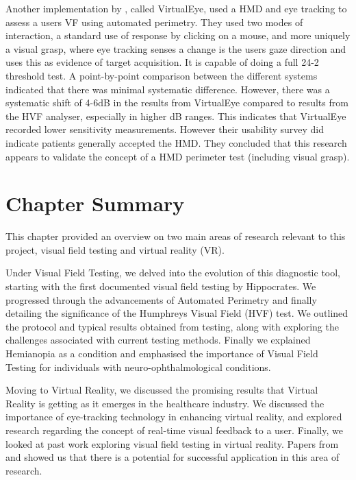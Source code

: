 \documentclass{l4proj}
\begin{document}
Another implementation by \citet{Wroblewski2014TestingVisualField}, called VirtualEye, used a HMD and eye tracking to assess a users VF using automated perimetry. They used two modes of interaction, a standard use of response by clicking on a mouse, and more uniquely a visual grasp, where eye tracking senses a change is the users gaze direction and uses this as evidence of target acquisition. It is capable of doing a full 24-2 threshold test. A point-by-point comparison between the different systems indicated that there was minimal systematic difference. However, there was a systematic shift of 4-6dB in the results from VirtualEye compared to results from the HVF analyser, especially in higher dB ranges. This indicates that VirtualEye recorded lower sensitivity measurements. However their usability survey did indicate patients generally accepted the HMD. They concluded that this research appears to validate the concept of a HMD perimeter test (including visual grasp).

\section{Chapter Summary}
This chapter provided an overview on two main areas of research relevant to this project, visual field testing and virtual reality (VR).

Under Visual Field Testing, we delved into the evolution of this diagnostic tool, starting with the first documented visual field testing by Hippocrates. We progressed through the advancements of Automated Perimetry and finally detailing the significance of the Humphreys Visual Field (HVF) test. We outlined the protocol and typical results obtained from testing, along with exploring the challenges associated with current testing methods. Finally we explained Hemianopia as a condition and emphasised the importance of Visual Field Testing for individuals with neuro-ophthalmological conditions.

Moving to Virtual Reality, we discussed the promising results that Virtual Reality is getting as it emerges in the healthcare industry. We discussed the importance of eye-tracking technology in enhancing virtual reality, and explored research regarding the concept of real-time visual feedback to a user. Finally, we looked at past work exploring visual field testing in virtual reality. Papers from \citet{Stapelfeldt2021VRGlaucoma} and \cite{Wroblewski2014TestingVisualField} showed us that there is a potential for successful application in this area of research.
\end{document}
